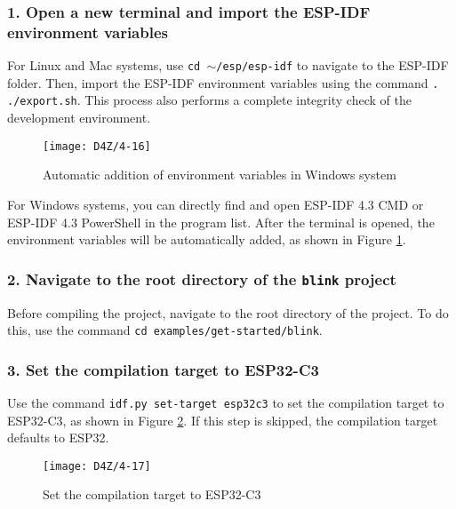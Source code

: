 \documentclass[a4paper,12pt]{book}
\begin{document}
\subsubsection{1. Open a new terminal and import the ESP-IDF environment variables}
For Linux and Mac systems, use \texttt{cd $\sim$/esp/esp-idf} to navigate to the ESP-IDF folder. Then, import the ESP-IDF environment variables using the command \verb|. ./export.sh|. This process also performs a complete integrity check of the development environment.


\begin{figure}[h!]
    \Centering
    \texttt{[image: D4Z/4-16]}
    \caption{Automatic addition of environment variables in Windows system}
    \label{Automatic addition of environment variables in Windows system}
\end{figure}

For Windows systems, you can directly find and open ESP-IDF 4.3 CMD or ESP-IDF 4.3 PowerShell in the program list. After the terminal is opened, the environment variables will be automatically added, as shown in Figure \ref{Automatic addition of environment variables in Windows system}.

\subsubsection{2. Navigate to the root directory of the \texttt{blink} project}
Before compiling the project, navigate to the root directory of the project. To do this, use the command \verb|cd examples/get-started/blink|.

\subsubsection{3. Set the compilation target to ESP32-C3}
Use the command \verb|idf.py set-target esp32c3| to set the compilation target to ESP32-C3, as shown in Figure \ref{Set the compilation target to ESP32-C3}. If this step is skipped, the compilation target defaults to ESP32.

\begin{figure}[h!]
    \Centering
    \texttt{[image: D4Z/4-17]}
    \caption{Set the compilation target to ESP32-C3}
    \label{Set the compilation target to ESP32-C3}
\end{figure}
\end{document}
